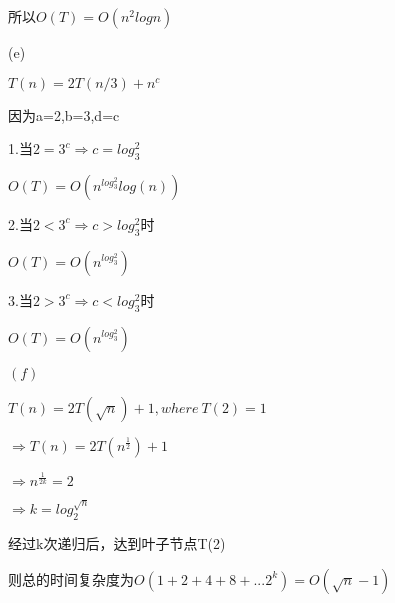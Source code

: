 \documentclass[
]{article}
\begin{document}
所以\(O(T)=O(n^2logn)\)

(e)

\(T(n)=2T(n/3)+n^{c}\)

因为a=2,b=3,d=c

1.当\(2=3^c\Rightarrow c=log_3^2\)

\(O(T)=O(n^{log_3^2}log(n))\)

2.当\(2<3^c\Rightarrow c>log_3^2\)时

\(O(T)=O(n^{log_3^2})\)

3.当\(2 > 3^c\Rightarrow c<log_3^2\)时

\(O(T)=O(n^{log_3^2})\)

\((f)\)

\(T(n)=2T(\sqrt{n})+1,where\ T(2)=1\)

\(\Rightarrow T(n)=2T(n^{\frac{1}{2}})+1\)

\(\Rightarrow n^{\frac{1}{2k}}=2\)

\(\Rightarrow k=log_{2}^{\sqrt{n}}\)

经过k次递归后，达到叶子节点T(2)

则总的时间复杂度为\(O(1+2+4+8+...2^{k})=O(\sqrt{n}-1)\)
\end{document}
